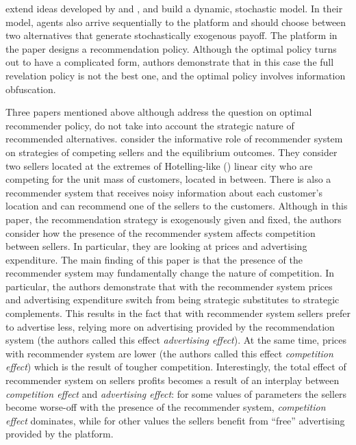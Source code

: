 \documentclass[a4paper]{article}
\begin{document}
	
	
	
	\cite{papanastasiou2017} extend ideas developed by \cite{kremer2014} and \cite{che2015}, and build a dynamic, stochastic model. In their model, agents also arrive sequentially to the platform and should choose between two alternatives that generate stochastically exogenous payoff. The platform in the paper designs a recommendation policy. Although the optimal policy turns out to have a complicated form, authors demonstrate that in this case the full revelation policy is not the best one, and the optimal policy involves information obfuscation.
	
Three papers mentioned above although address the question on optimal recommender policy, do not take into account the strategic nature of recommended alternatives.
\cite{chen2016advertising} consider the informative role of recommender system on strategies of competing sellers and the equilibrium outcomes. They consider two sellers located at the extremes of Hotelling-like (\cite{harold1929stability}) linear city who are competing for the unit mass of customers, located in between. There is also a recommender system that receives noisy information about each customer's location and can recommend one of the sellers to the customers. Although in this paper, the recommendation strategy is exogenously given and fixed, the authors consider how the presence of the recommender system affects competition between sellers. In particular, they are looking at prices and advertising expenditure. The main finding of this paper is that the presence of the recommender system may fundamentally change the nature of competition. In particular, the authors demonstrate that with the recommender system prices and advertising expenditure switch from being strategic substitutes to strategic complements. This results in the fact that with recommender system sellers prefer to advertise less, relying more on advertising provided by the recommendation system (the authors called this effect \textit{advertising effect}). At the same time, prices with recommender system are lower (the authors called this effect \textit{competition effect}) which is the result of tougher competition. Interestingly, the total effect of recommender system on sellers profits becomes a result of an interplay between \textit{competition effect} and \textit{advertising effect}: for some values of parameters the sellers become worse-off with the presence of the recommender system, \textit{competition effect} dominates, while for other values the sellers benefit from ``free'' advertising provided by the platform.
\end{document}
